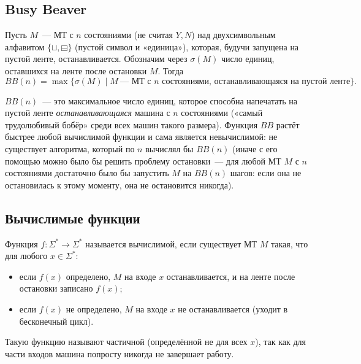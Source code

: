 \documentclass[12pt]{article}
\begin{document}
    \subsection{Busy Beaver}
    
    \begin{definition}
    	Пусть $M$~--- МТ с $n$ состояниями (не считая $Y, N$) над двухсимвольным алфавитом $\{ \sqcup, \boxminus \}$ (пустой символ и «единица»), которая, будучи запущена на пустой ленте, останавливается. Обозначим через $\sigma(M)$ число единиц, оставшихся на ленте после остановки $M$. Тогда
    	\[
    	BB(n) = \max \{ \sigma(M) \mid M~\text{--- МТ с $n$ состояниями, останавливающаяся на пустой ленте} \}.
    	\]
    \end{definition}
    
    \begin{note}
    	$BB(n)$~--- это максимальное число единиц, которое способна напечатать на пустой ленте \emph{останавливающаяся} машина с $n$ состояниями («самый трудолюбивый бобёр» среди всех машин такого размера). Функция $BB$ растёт быстрее любой вычислимой функции и сама является невычислимой: не существует алгоритма, который по $n$ вычислял бы $BB(n)$ (иначе с его помощью можно было бы решить проблему остановки~--- для любой МТ $M$ с $n$ состояниями достаточно было бы запустить $M$ на $BB(n)$ шагов: если она не остановилась к этому моменту, она не остановится никогда).
    \end{note}
    
    \subsection{Вычислимые функции}
    
    \begin{definition}
    	Функция $f: \Sigma^* \rightarrow \Sigma^*$ называется вычислимой, если существует МТ $M$ такая, что для любого $x \in \Sigma^*$:
    	\begin{itemize}
    		\item если $f(x)$ определено, $M$ на входе $x$ останавливается, и на ленте после остановки записано $f(x)$;
    		\item если $f(x)$ не определено, $M$ на входе $x$ не останавливается (уходит в бесконечный цикл).
    	\end{itemize}
    	Такую функцию называют частичной (определённой не для всех $x$), так как для части входов машина попросту никогда не завершает работу.
    \end{definition}
    
\end{document}

